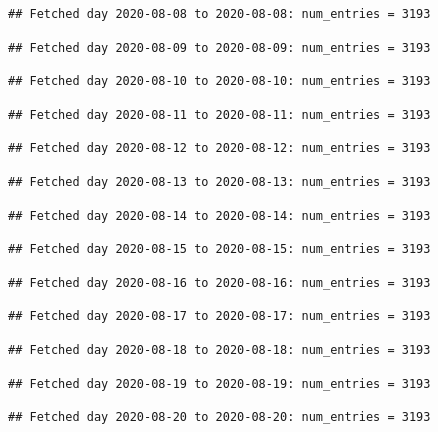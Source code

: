 \documentclass[]{article}
\begin{document}
\begin{verbatim}
## Fetched day 2020-08-08 to 2020-08-08: num_entries = 3193
\end{verbatim}

\begin{verbatim}
## Fetched day 2020-08-09 to 2020-08-09: num_entries = 3193
\end{verbatim}

\begin{verbatim}
## Fetched day 2020-08-10 to 2020-08-10: num_entries = 3193
\end{verbatim}

\begin{verbatim}
## Fetched day 2020-08-11 to 2020-08-11: num_entries = 3193
\end{verbatim}

\begin{verbatim}
## Fetched day 2020-08-12 to 2020-08-12: num_entries = 3193
\end{verbatim}

\begin{verbatim}
## Fetched day 2020-08-13 to 2020-08-13: num_entries = 3193
\end{verbatim}

\begin{verbatim}
## Fetched day 2020-08-14 to 2020-08-14: num_entries = 3193
\end{verbatim}

\begin{verbatim}
## Fetched day 2020-08-15 to 2020-08-15: num_entries = 3193
\end{verbatim}

\begin{verbatim}
## Fetched day 2020-08-16 to 2020-08-16: num_entries = 3193
\end{verbatim}

\begin{verbatim}
## Fetched day 2020-08-17 to 2020-08-17: num_entries = 3193
\end{verbatim}

\begin{verbatim}
## Fetched day 2020-08-18 to 2020-08-18: num_entries = 3193
\end{verbatim}

\begin{verbatim}
## Fetched day 2020-08-19 to 2020-08-19: num_entries = 3193
\end{verbatim}

\begin{verbatim}
## Fetched day 2020-08-20 to 2020-08-20: num_entries = 3193
\end{verbatim}
\end{document}
